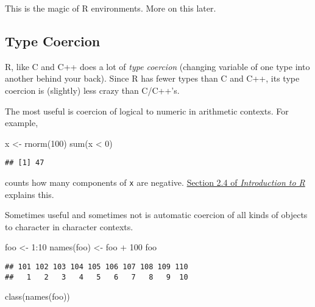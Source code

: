 \documentclass[
]{article}
\newenvironment{Shaded}{\begin{snugshade}}{\end{snugshade}}
\newcommand{\DecValTok}[1]{\textcolor[rgb]{0.00,0.00,0.81}{#1}}
\newcommand{\FunctionTok}[1]{\textcolor[rgb]{0.00,0.00,0.00}{#1}}
\newcommand{\NormalTok}[1]{#1}
\newcommand{\OtherTok}[1]{\textcolor[rgb]{0.56,0.35,0.01}{#1}}
\newcommand{\SpecialCharTok}[1]{\textcolor[rgb]{0.00,0.00,0.00}{#1}}
\begin{document}
This is the magic of R environments. More on this later.

\hypertarget{type-coercion}{%
\subsection{Type Coercion}\label{type-coercion}}

R, like C and C++ does a lot of \emph{type coercion} (changing variable
of one type into another behind your back). Since R has fewer types than
C and C++, its type coercion is (slightly) less crazy than C/C++'s.

The most useful is coercion of logical to numeric in arithmetic
contexts. For example,

\begin{Shaded}
\begin{Highlighting}[]
\NormalTok{x }\OtherTok{\textless{}{-}} \FunctionTok{rnorm}\NormalTok{(}\DecValTok{100}\NormalTok{)}
\FunctionTok{sum}\NormalTok{(x }\SpecialCharTok{\textless{}} \DecValTok{0}\NormalTok{)}
\end{Highlighting}
\end{Shaded}

\begin{verbatim}
## [1] 47
\end{verbatim}

counts how many components of \texttt{x} are negative.
\href{https://cloud.r-project.org/doc/manuals/r-release/R-intro.html\#Logical-vectors}{Section
2.4 of \emph{Introduction to R}} explains this.

Sometimes useful and sometimes not is automatic coercion of all kinds of
objects to character in character contexts.

\begin{Shaded}
\begin{Highlighting}[]
\NormalTok{foo }\OtherTok{\textless{}{-}} \DecValTok{1}\SpecialCharTok{:}\DecValTok{10}
\FunctionTok{names}\NormalTok{(foo) }\OtherTok{\textless{}{-}}\NormalTok{ foo }\SpecialCharTok{+} \DecValTok{100}
\NormalTok{foo}
\end{Highlighting}
\end{Shaded}

\begin{verbatim}
## 101 102 103 104 105 106 107 108 109 110 
##   1   2   3   4   5   6   7   8   9  10
\end{verbatim}

\begin{Shaded}
\begin{Highlighting}[]
\FunctionTok{class}\NormalTok{(}\FunctionTok{names}\NormalTok{(foo))}
\end{Highlighting}
\end{Shaded}
\end{document}
